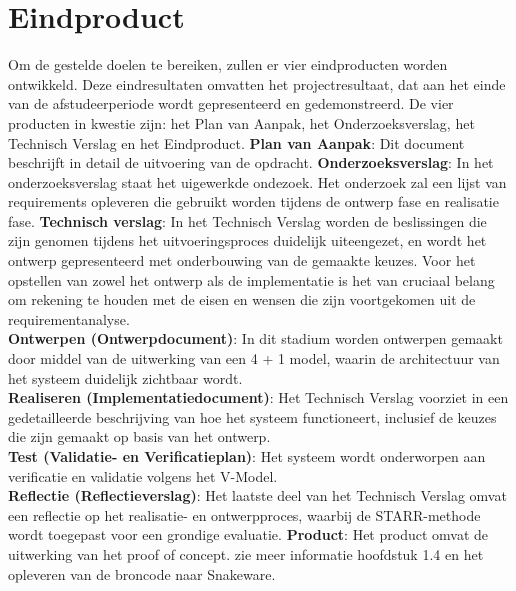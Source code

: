 \section{Eindproduct}
Om de gestelde doelen te bereiken, zullen er vier eindproducten worden ontwikkeld.
Deze eindresultaten omvatten het projectresultaat, dat aan het einde van de afstudeerperiode wordt gepresenteerd en gedemonstreerd.
De vier producten in kwestie zijn: het Plan van Aanpak, het Onderzoeksverslag, het Technisch Verslag en het Eindproduct.
\whitespace
\textbf{Plan van Aanpak}: Dit document beschrijft in detail de uitvoering van de opdracht.
\whitespace
\textbf{Onderzoeksverslag}: In het onderzoeksverslag staat het uigewerkde ondezoek.
Het onderzoek zal een lijst van requirements opleveren die gebruikt worden tijdens de ontwerp fase en realisatie fase.
\whitespace
\textbf{Technisch verslag}: In het Technisch Verslag worden de beslissingen die zijn genomen tijdens het uitvoeringsproces duidelijk uiteengezet, en wordt het ontwerp gepresenteerd met onderbouwing van de gemaakte keuzes.
Voor het opstellen van zowel het ontwerp als de implementatie is het van cruciaal belang om rekening te houden met de eisen en wensen die zijn voortgekomen uit de requirementanalyse. \\
\textbf{Ontwerpen (Ontwerpdocument)}: In dit stadium worden ontwerpen gemaakt door middel van de uitwerking van een 4 + 1 model, waarin de architectuur van het systeem duidelijk zichtbaar wordt.\\
\textbf{Realiseren (Implementatiedocument)}: Het Technisch Verslag voorziet in een gedetailleerde beschrijving van hoe het systeem functioneert, inclusief de keuzes die zijn gemaakt op basis van het ontwerp. \\
\textbf{Test (Validatie- en Verificatieplan)}: Het systeem wordt onderworpen aan verificatie en validatie volgens het V-Model.                                                                                             \\
\textbf{Reflectie (Reflectieverslag)}: Het laatste deel van het Technisch Verslag omvat een reflectie op het realisatie- en ontwerpproces, waarbij de STARR-methode \Parencite{STARR} wordt toegepast voor een grondige evaluatie.
\whitespace
\textbf{Product}: Het product omvat de uitwerking van het proof of concept. zie meer informatie hoofdstuk 1.4 en het opleveren van de broncode naar Snakeware.

